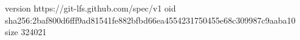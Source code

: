 version https://git-lfs.github.com/spec/v1
oid sha256:2baf800d6fff9ad81541fe882bfbd66ea4554231750455e68c309987c9aaba10
size 324021
